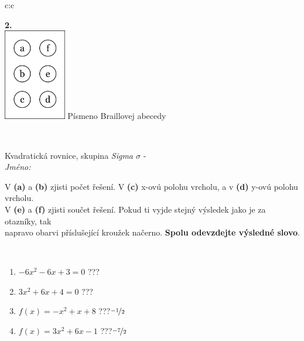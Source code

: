\documentclass[10pt]{report}
\begin{document}
\begin{tabular}{c:c}
\begin{minipage}[c][104.5mm][t]{0.5\linewidth}
\begin{center}
\begin{minipage}{0.20\linewidth}
\begin{center}
{\Huge\bfseries 2.} \\[2mm]
\includegraphics[height=40mm]{../images/braille.png}
{\small Písmeno Braillovej abecedy}
\end{center}
\end{minipage}
\end{center}
\end{minipage}
\\ \hdashline
\begin{minipage}[c][104.5mm][t]{0.5\linewidth}
\begin{center}
\vspace{7mm}
{\huge Kvadratická rovnice, skupina \textit{Sigma $\sigma$} -}\\[5mm]
\textit{Jméno:}\phantom{xxxxxxxxxxxxxxxxxxxxxxxxxxxxxxxxxxxxxxxxxxxxxxxxxxxxxxxxxxxxxxxxx}\\[5mm]
\begin{minipage}{0.95\linewidth}
\begin{center}
V \textbf{(a)} a \textbf{(b)} zjisti počet řešení. V \textbf{(c)} x-ovú polohu vrcholu, a v \textbf{(d)} y-ovú polohu vrcholu.\\V \textbf{(e)} a \textbf{(f)} zjisti součet řešení. Pokud ti vyjde stejný výsledek jako je za otazníky, tak\\napravo obarvi příslušející kroužek načerno. \textbf{Spolu odevzdejte výsledné slovo}.
\end{center}
\end{minipage}
\\[1mm]
\begin{minipage}{0.79\linewidth}
\begin{center}
\begin{varwidth}{\linewidth}
\begin{enumerate}
\Large
\item $-6x^2-6x+3=0$\quad \dotfill\; ???\;\dotfill {}
\item $3x^2+6x+4=0$\quad \dotfill\; ???\;\dotfill {}
\item $f(x)=-x^2+x+8$\quad \dotfill\; ???\;\dotfill \quad $\nicefrac{-1}{2}$
\item $f(x)=3x^2+6x-1$\quad \dotfill\; ???\;\dotfill \quad $\nicefrac{-7}{2}$

\end{enumerate}
\end{varwidth}
\end{center}
\end{minipage}
\end{center}
\end{minipage}
\end{tabular}
\end{document}
